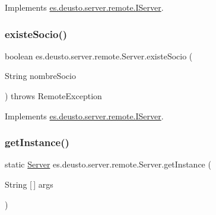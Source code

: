 Implements \mbox{\hyperlink{interfacees_1_1deusto_1_1server_1_1remote_1_1_i_server_a145e3b64f34bedd019267417d8efcc64}{es.\+deusto.\+server.\+remote.\+I\+Server}}.

\mbox{\label{classes_1_1deusto_1_1server_1_1remote_1_1_server_aba00b1ee900945e8004bc285d00a8c95}} 
\subsubsection{\texorpdfstring{existeSocio()}{existeSocio()}}
{\footnotesize\ttfamily boolean es.\+deusto.\+server.\+remote.\+Server.\+existe\+Socio (\begin{DoxyParamCaption}\item[{String}]{nombre\+Socio }\end{DoxyParamCaption}) throws Remote\+Exception}



Implements \mbox{\hyperlink{interfacees_1_1deusto_1_1server_1_1remote_1_1_i_server_a9c3a20fd809291100bd8c3259a857d2b}{es.\+deusto.\+server.\+remote.\+I\+Server}}.

\mbox{\label{classes_1_1deusto_1_1server_1_1remote_1_1_server_a030f63775beb7b2d6a60d7626af45764}} 
\subsubsection{\texorpdfstring{getInstance()}{getInstance()}}
{\footnotesize\ttfamily static \mbox{\hyperlink{classes_1_1deusto_1_1server_1_1remote_1_1_server}{Server}} es.\+deusto.\+server.\+remote.\+Server.\+get\+Instance (\begin{DoxyParamCaption}\item[{String \mbox{[}$\,$\mbox{]}}]{args }\end{DoxyParamCaption})\hspace{0.3cm}{\ttfamily [static]}}

\mbox{\label{classes_1_1deusto_1_1server_1_1remote_1_1_server_a6aba80b9dc49313f765f5720aa4ae2a7}} 
